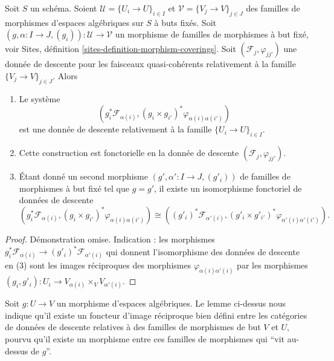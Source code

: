 \begin{lemma}
\label{lemma-map-families}
Soit $S$ un schéma.
Soient $\mathcal{U} = \{U_i \to U\}_{i \in I}$ et
$\mathcal{V} = \{V_j \to V\}_{j \in J}$
des familles de morphismes d'espaces algébriques sur $S$ à buts fixés.
Soit $(g, \alpha : I \to J, (g_i)) : \mathcal{U} \to \mathcal{V}$
un morphisme de familles de morphismes à but fixé, voir
Sites, définition \ref{sites-definition-morphism-coverings}.
Soit $(\mathcal{F}_j, \varphi_{jj'})$ une donnée de descente
pour les faisceaux quasi-cohérents relativement à la
famille $\{V_j \to V\}_{j \in J}$. Alors
\begin{enumerate}
\item Le système
$$
\left(g_i^*\mathcal{F}_{\alpha(i)},
(g_i \times g_{i'})^*\varphi_{\alpha(i)\alpha(i')}\right)
$$
est une donnée de descente relativement à la famille $\{U_i \to U\}_{i \in I}$.
\item Cette construction est fonctorielle en la donnée de descente
$(\mathcal{F}_j, \varphi_{jj'})$.
\item Étant donné un second morphisme
$(g', \alpha' : I \to J, (g'_i))$
de familles de morphismes à but fixé
tel que $g = g'$, il existe un isomorphisme fonctoriel de données de descente
$$
(g_i^*\mathcal{F}_{\alpha(i)},
(g_i \times g_{i'})^*\varphi_{\alpha(i)\alpha(i')})
\cong
((g'_i)^*\mathcal{F}_{\alpha'(i)},
(g'_i \times g'_{i'})^*\varphi_{\alpha'(i)\alpha'(i')}).
$$
\end{enumerate}
\end{lemma}

\begin{proof}
Démonstration omise. Indication : les morphismes
$g_i^*\mathcal{F}_{\alpha(i)} \to (g'_i)^*\mathcal{F}_{\alpha'(i)}$
qui donnent l'isomorphisme des données de descente en (3)
sont les images réciproques des morphismes $\varphi_{\alpha(i)\alpha'(i)}$ par les
morphismes $(g_i, g'_i) : U_i \to V_{\alpha(i)} \times_V V_{\alpha'(i)}$.
\end{proof}

\noindent
Soit $g : U \to V$ un morphisme d'espaces algébriques.
Le lemme ci-dessus nous indique qu'il existe un foncteur d'image réciproque bien défini
entre les catégories de données de descente relatives à des familles de
morphismes de but $V$ et $U$, pourvu qu'il existe un morphisme entre ces
familles de morphismes qui ``vit au-dessus de $g$''.

